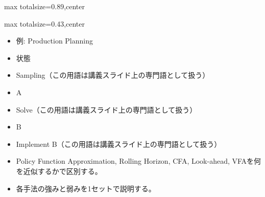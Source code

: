 \begin{minipage}[t]{0.58\textwidth}
\begin{adjustbox}{max totalsize={\textwidth}{0.89\textheight},center}
\begin{minipage}{\textwidth}
\end{minipage}
\end{adjustbox}
\end{minipage}


\clearpage
{}
\begin{minipage}[t]{0.405\textwidth}
\begin{adjustbox}{max totalsize={\textwidth}{0.43\textheight},center}
\begin{minipage}{\textwidth}\scriptsize
{}\begin{itemize}
\item 例: Production Planning
\item 状態
\item Sampling（この用語は講義スライド上の専門語として扱う）
\item A
\item Solve（この用語は講義スライド上の専門語として扱う）
\item B
\item Implement B（この用語は講義スライド上の専門語として扱う）
\end{itemize}\begin{itemize}
\item Policy Function Approximation, Rolling Horizon, CFA, Look-ahead, VFAを何を近似するかで区別する。
\item 各手法の強みと弱みを1セットで説明する。
\end{itemize}
\end{minipage}
\end{adjustbox}
\end{minipage}\hfill
